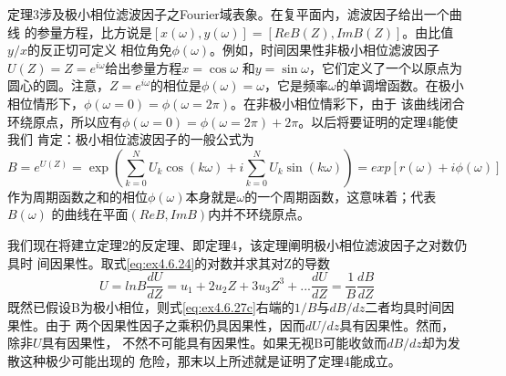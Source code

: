 定理3涉及极小相位滤波因子之Fourier域表象。在复平面内，滤波因子给出一个曲线
的参量方程，比方说是$[x(\omega),y(\omega)]=[ReB(Z),ImB(Z)]$。由比值$y/x$的反正切可定义
相位角免$\phi(\omega)$。例如，时间因果性非极小相位滤波因子$U(Z)=Z=e^{i\omega}$给出参量方程$x=\cos\omega$
和$y=\sin\omega$，它们定义了一个以原点为圆心的圆。注意，$Z=e^{i\omega}$的相位是$\phi (\omega)=\omega$，它是频率$\omega$的单调增函数。在极小相位情形下，$\phi(\omega=0)=\phi(\omega=2\pi)$。在非极小相位情彩下，由于
该曲线闭合环绕原点，所以应有$\phi(\omega=0)=\phi(\omega=2\pi)+2\pi$。以后将要证明的定理4能使我们
肯定：极小相位滤波因子的一般公式为
\begin{subequations}
\begin{equation}
B=e^{U(Z)}=\exp(\sum_{k=0}^NU_k\cos(k\omega)+i\sum_{k=0}^NU_k\sin(k\omega))
\label{eq:ex4.6.26a}
\end{equation}
\begin{equation}
=exp[r(\omega)+i\phi(\omega)]
\label{eq:ex4.6.26b}
\end{equation}
\label{eq:ex4.6.26}
\end{subequations}
作为周期函数之和的相位$\phi(\omega)$本身就是$\omega$的一个周期函数，这意味着；代表$B(\omega)$
的曲线在平面$(ReB,ImB)$内并不环绕原点。

我们现在将建立定理2的反定理、即定理4，该定理阐明极小相位滤波因子之对数仍具时
间因果性。取式\ref{eq:ex4.6.24}的对数并求其对Z的导数
\begin{subequations}
\begin{equation}
U=lnB
\label{eq:ex4.6.27a}
\end{equation}
\begin{equation}
\frac{dU}{dZ}=u_1+2u_2Z+
3u_3Z^3+...
\label{eq:ex4.6.27b}
\end{equation}
\begin{equation}
\frac{dU}{dZ}=\frac{1}{B}\frac{dB}{dZ}
\label{eq:ex4.6.27c}
\end{equation}
\label{eq:ex4.6.27}
\end{subequations}
既然已假设B为极小相位，则式\ref{eq:ex4.6.27c}右端的$1/B$与$dB/dz$二者均具时间因果性。由于
两个因果性因子之乘积仍具因果性，因而$dU/dz$具有因果性。然而，除非$U$具有因果性，
不然不可能具有因果性。如果无视B可能收敛而$dB/dz$却为发散这种极少可能出现的
危险，那末以上所述就是证明了定理4能成立。


